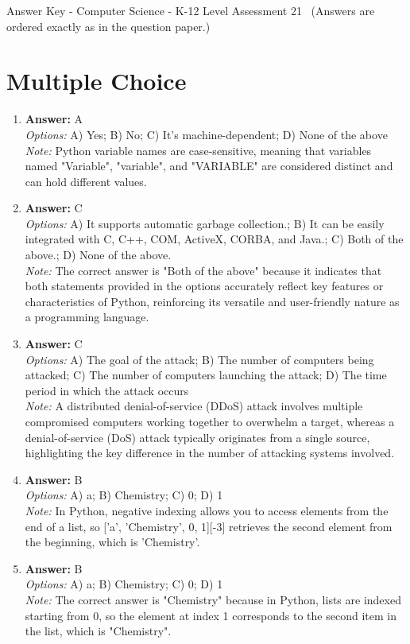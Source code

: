 \documentclass[12pt]{article}
\begin{document}
\begin{center}
Answer Key - Computer Science - K-12 Level Assessment 21 \
\small (Answers are ordered exactly as in the question paper.)
\end{center}

\section*{Multiple Choice}
\begin{enumerate}[label=\arabic*.]
\item \textbf{Answer:} A
\\ \textit{Options:} A) Yes; B) No; C) It's machine-dependent; D) None of the above
\\ \textit{Note:} Python variable names are case-sensitive, meaning that variables named "Variable", "variable", and "VARIABLE" are considered distinct and can hold different values.
\item \textbf{Answer:} C
\\ \textit{Options:} A) It supports automatic garbage collection.; B) It can be easily integrated with C, C++, COM, ActiveX, CORBA, and Java.; C) Both of the above.; D) None of the above.
\\ \textit{Note:} The correct answer is "Both of the above" because it indicates that both statements provided in the options accurately reflect key features or characteristics of Python, reinforcing its versatile and user-friendly nature as a programming language.
\item \textbf{Answer:} C
\\ \textit{Options:} A) The goal of the attack; B) The number of computers being attacked; C) The number of computers launching the attack; D) The time period in which the attack occurs
\\ \textit{Note:} A distributed denial-of-service (DDoS) attack involves multiple compromised computers working together to overwhelm a target, whereas a denial-of-service (DoS) attack typically originates from a single source, highlighting the key difference in the number of attacking systems involved.
\item \textbf{Answer:} B
\\ \textit{Options:} A) a; B) Chemistry; C) 0; D) 1
\\ \textit{Note:} In Python, negative indexing allows you to access elements from the end of a list, so ['a', 'Chemistry', 0, 1][-3] retrieves the second element from the beginning, which is 'Chemistry'.
\item \textbf{Answer:} B
\\ \textit{Options:} A) a; B) Chemistry; C) 0; D) 1
\\ \textit{Note:} The correct answer is "Chemistry" because in Python, lists are indexed starting from 0, so the element at index 1 corresponds to the second item in the list, which is "Chemistry".
\end{enumerate}
\end{document}
